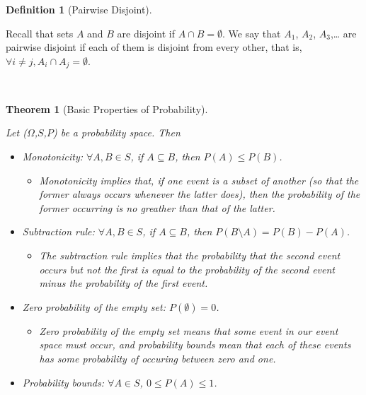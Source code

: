 \documentclass[
]{article}
\providecommand{\tightlist}{%
  \setlength{\itemsep}{0pt}\setlength{\parskip}{0pt}}
\newtheorem{theorem}{Theorem}[section]
\theoremstyle{definition}
\newtheorem{definition}{Definition}[section]
\theoremstyle{definition}
\theoremstyle{definition}
\theoremstyle{remark}
\begin{document}
\begin{definition}[Pairwise Disjoint]
\protect\hypertarget{def:unlabeled-div-3}{}\label{def:unlabeled-div-3}

Recall that sets \(A\) and \(B\) are disjoint if \(A \cap B = \emptyset\). We say that \(A_1\), \(A_2\), \(A_3\),\ldots{} are pairwise disjoint if each of them is disjoint from every other, that is, \(\forall i \ne j, A_i \cap A_j = \emptyset\).

~

\end{definition}

\begin{theorem}[Basic Properties of Probability]
\protect\hypertarget{thm:unlabeled-div-4}{}\label{thm:unlabeled-div-4}

Let (\(\Omega\),\(S\),\(P\)) be a probability space. Then

\begin{itemize}
\tightlist
\item
  \emph{Monotonicity}: \(\forall A, B \in S\), if \(A \subseteq B\), then \(P(A) \le P(B)\).

  \begin{itemize}
  \tightlist
  \item
    Monotonicity implies that, if one event is a subset of another (so that the former always occurs whenever the latter does), then the probability of the former occurring is no greather than that of the latter.
  \end{itemize}
\item
  \emph{Subtraction rule}: \(\forall A, B \in S\), if \(A \subseteq B\), then \(P(B \setminus A) = P(B) - P(A)\).

  \begin{itemize}
  \tightlist
  \item
    The subtraction rule implies that the probability that the second event occurs but not the first is equal to the probability of the second event minus the probability of the first event.
  \end{itemize}
\item
  \emph{Zero probability of the empty set}: \(P(\emptyset) = 0\).

  \begin{itemize}
  \tightlist
  \item
    Zero probability of the empty set means that some event in our event space must occur, and probability bounds mean that each of these events has some probability of occuring between zero and one.
  \end{itemize}
\item
  \emph{Probability bounds}: \(\forall A \in S\), \(0 \le P(A) \le 1\).


\end{itemize}
\end{theorem}
\end{document}
